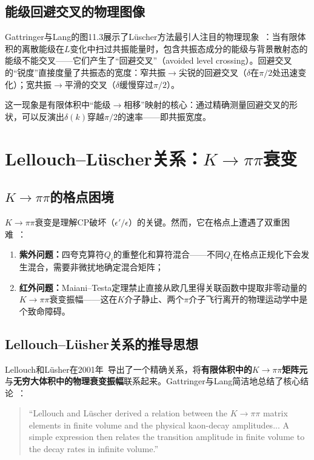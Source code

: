 \documentclass[12pt,a4paper]{ctexart}
\theoremstyle{definition}
\begin{document}
\subsection{能级回避交叉的物理图像}

Gattringer与Lang的图11.3展示了L\"uscher方法最引人注目的物理现象~\cite{GattringerLang2010}：当有限体积的离散能级在$L$变化中扫过共振能量时，包含共振态成分的能级与背景散射态的能级不能交叉——它们产生了``回避交叉''（avoided level crossing）。回避交叉的``锐度''直接度量了共振态的宽度：窄共振$\to$尖锐的回避交叉（$\delta$在$\pi/2$处迅速变化）；宽共振$\to$平滑的交叉（$\delta$缓慢穿过$\pi/2$）。

这一现象是有限体积中``能级$\to$相移''映射的核心：通过精确测量回避交叉的形状，可以反演出$\delta(k)$穿越$\pi/2$的速率——即共振宽度。

\section{Lellouch--L\"uscher关系：$K\to\pi\pi$衰变}

\subsection{$K\to\pi\pi$的格点困境}

$K\to\pi\pi$衰变是理解CP破坏（$\epsilon'/\epsilon$）的关键。然而，它在格点上遭遇了双重困难~\cite{decayChannels2026}：

\begin{enumerate}[leftmargin=*]
    \item \textbf{紫外问题：}四夸克算符$Q_i$的重整化和算符混合——不同$Q_i$在格点正规化下会发生混合，需要非微扰地确定混合矩阵；
    \item \textbf{红外问题：}Maiani--Testa定理禁止直接从欧几里得关联函数中提取非零动量的$K\to\pi\pi$衰变振幅——这在$K$介子静止、两个$\pi$介子飞行离开的物理运动学中是个致命障碍。
\end{enumerate}

\subsection{Lellouch--L\"usher关系的推导思想}

Lellouch和L\"usher在2001年~\cite{decayChannels2026}导出了一个精确关系，将\textbf{有限体积中的$K\to\pi\pi$矩阵元}与\textbf{无穷大体积中的物理衰变振幅}联系起来。Gattringer与Lang简洁地总结了核心结论~\cite{GattringerLang2010}：
\begin{quote}
``Lellouch and L\"uscher derived a relation between the $K \to \pi\pi$ matrix elements in finite volume and the physical kaon-decay amplitudes... A simple expression then relates the transition amplitude in finite volume to the decay rates in infinite volume.''
\end{quote}
\end{document}
